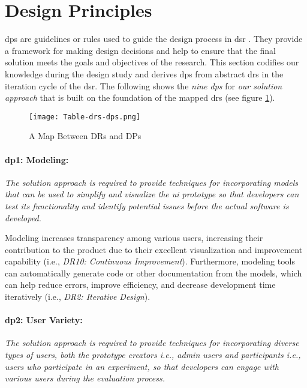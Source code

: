 \section{Design Principles}
\label{design:section:designprinciple}
\ac{dp}s are guidelines or rules used to guide the design process in \ac{dsr} \cite{misc:dsr:henver}. 
They provide a framework for making design decisions \cite{paper:designprinciple:gregor} and help to ensure that the final solution meets the goals and objectives of the research. 
This section codifies our knowledge during the design study and derives \ac{dp}s from abstract \ac{dr}s in the iteration cycle of the \ac{dsr}.
The following shows the \textit{nine \ac{dp}s} for \textit{our solution approach} that is built on the foundation of the mapped \ac{dr}s (see figure \ref{fig:design:table-drs-dps}). 
\begin{figure}[htbp!]
  \centering    
  \texttt{[image: Table-drs-dps.png]}
  \caption[A Map Between DRs and DPs]{A Map Between DRs and DPs}
  \label{fig:design:table-drs-dps}
\end{figure}
\clearpage

\paragraph{\ac{dp}1: Modeling:} \textit{The solution approach is required to provide techniques for incorporating models that can be used to simplify and visualize the \ac{ui} prototype so that developers can test its functionality and identify potential issues before the actual software is developed.}

Modeling increases transparency among various users, increasing their contribution to the product due to their excellent visualization and improvement capability (i.e., \textit{DR10: Continuous Improvement}).
Furthermore, modeling tools can automatically generate code or other documentation from the models, which can help reduce errors, improve efficiency, and decrease development time iteratively (i.e., \textit{DR2: Iterative Design}).

\paragraph{\ac{dp}2: User Variety:} \textit{The solution approach is required to provide techniques for incorporating diverse types of users, both the prototype creators i.e., admin users and participants i.e., users who participate in an experiment, so that developers can engage with various users during the evaluation process.}

